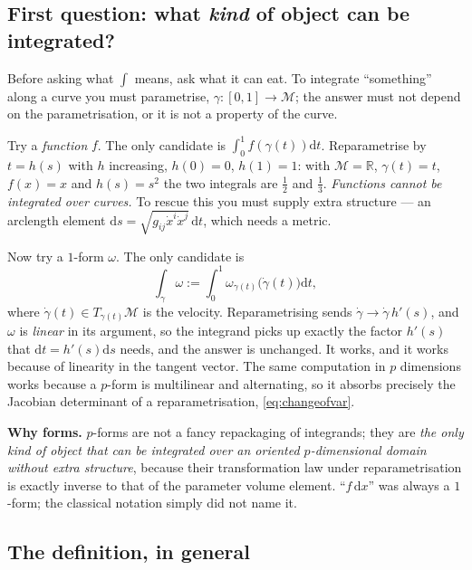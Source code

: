 \documentclass[10pt,a4paper]{article}
\newcommand{\dd}{\mathrm{d}}
\newcommand{\R}{\mathbb{R}}
\newcommand{\M}{\mathcal{M}}
\theoremstyle{plain}
\theoremstyle{definition}
\numberwithin{equation}{section}
\begin{document}
\subsection{First question: what \emph{kind} of object can be integrated?}

Before asking what $\int$ means, ask what it can eat. To integrate ``something'' along a curve
you must parametrise, $\gamma:[0,1]\to\M$; the answer must not depend on the parametrisation,
or it is not a property of the curve.

Try a \emph{function} $f$. The only candidate is $\int_0^1 f(\gamma(t))\dd t$. Reparametrise by
$t=h(s)$ with $h$ increasing, $h(0)=0$, $h(1)=1$: with $\M=\R$, $\gamma(t)=t$, $f(x)=x$ and
$h(s)=s^2$ the two integrals are $\tfrac12$ and $\tfrac13$. \emph{Functions cannot be integrated
over curves.} To rescue this you must supply extra structure --- an arclength element
$\dd s=\sqrt{g_{ij}\dot x^i\dot x^j}\,\dd t$, which needs a metric.

Now try a $1$-form $\omega$. The only candidate is
\begin{equation}
\int_\gamma\omega:=\int_0^1\omega_{\gamma(t)}\big(\dot\gamma(t)\big)\dd t ,
\label{eq:curveint}
\end{equation}
where $\dot\gamma(t)\in T_{\gamma(t)}\M$ is the velocity. Reparametrising sends
$\dot\gamma\to\dot\gamma\,h'(s)$, and $\omega$ is \emph{linear} in its argument, so the
integrand picks up exactly the factor $h'(s)$ that $\dd t=h'(s)\dd s$ needs, and the answer is
unchanged. It works, and it works because of linearity in the tangent vector. The same
computation in $p$ dimensions works because a $p$-form is multilinear and alternating, so it
absorbs precisely the Jacobian determinant of a reparametrisation, \eqref{eq:changeofvar}.

\begin{keybox}
\textbf{Why forms.} $p$-forms are not a fancy repackaging of integrands; they are \emph{the
only kind of object that can be integrated over an oriented $p$-dimensional domain without
extra structure}, because their transformation law under reparametrisation is exactly inverse to
that of the parameter volume element. ``$f\,\dd x$'' was always a $1$-form; the classical
notation simply did not name it.
\end{keybox}

\subsection{The definition, in general}
\end{document}
